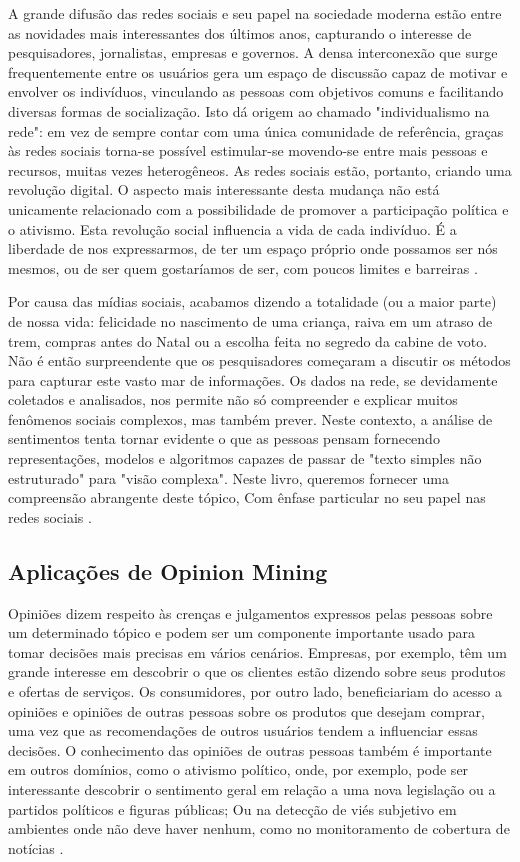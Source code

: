 \documentclass[
	12pt,				%
	openright,			%
	oneside,			%
	a4paper,			%
	english,			%
	spanish,			%
	brazil				%
	]{abntex2}
\begin{document}
A grande difusão das redes sociais e seu papel na sociedade moderna estão entre as novidades mais interessantes dos últimos anos, capturando o interesse de pesquisadores, jornalistas, empresas e governos. A densa interconexão que surge frequentemente entre os usuários gera um espaço de discussão capaz de motivar e envolver os indivíduos, vinculando as pessoas com objetivos comuns e facilitando diversas formas de socialização. Isto dá origem ao chamado "individualismo na rede": em vez de sempre contar com uma única comunidade de referência, graças às redes sociais torna-se possível estimular-se movendo-se entre mais pessoas e recursos, muitas vezes heterogêneos. As redes sociais estão, portanto, criando uma revolução digital. O aspecto mais interessante desta mudança não está unicamente relacionado com a possibilidade de promover a participação política e o ativismo. Esta revolução social influencia a vida de cada indivíduo. É a liberdade de nos expressarmos, de ter um espaço próprio onde possamos ser nós mesmos, ou de ser quem gostaríamos de ser, com poucos limites e barreiras \cite{book_sentiment_social}.

Por causa das mídias sociais, acabamos dizendo a totalidade (ou a maior parte) de nossa vida: felicidade no nascimento de uma criança, raiva em um atraso de trem, compras antes do Natal ou a escolha feita no segredo da cabine de voto. Não é então surpreendente que os pesquisadores começaram a discutir os métodos para capturar este vasto mar de informações. Os dados na rede, se devidamente coletados e analisados, nos permite não só compreender e explicar muitos fenômenos sociais complexos, mas também prever. Neste contexto, a análise de sentimentos tenta tornar evidente o que as pessoas pensam fornecendo representações, modelos e algoritmos capazes de passar de "texto simples não estruturado" para "visão complexa". Neste livro, queremos fornecer uma compreensão abrangente deste tópico, Com ênfase particular no seu papel nas redes sociais \cite{book_sentiment_social}.

	\subsection*{Aplicações de Opinion Mining}
	
	Opiniões dizem respeito às crenças e julgamentos expressos pelas pessoas sobre um determinado tópico e podem ser um componente importante usado para tomar decisões mais precisas em vários cenários\cite{book_discover_practices}. Empresas, por exemplo, têm um grande interesse em descobrir o que os clientes estão dizendo sobre seus produtos e ofertas de serviços. Os consumidores, por outro lado, beneficiariam do acesso a opiniões e opiniões de outras pessoas sobre os produtos que desejam comprar, uma vez que as recomendações de outros usuários tendem a influenciar essas decisões. O conhecimento das opiniões de outras pessoas também é importante em outros domínios, como o ativismo político, onde, por exemplo, pode ser interessante descobrir o sentimento geral em relação a uma nova legislação ou a partidos políticos e figuras públicas\cite{book_political_opinion}; Ou na detecção de viés subjetivo em ambientes onde não deve haver nenhum, como no monitoramento de cobertura de notícias \cite{book_discover_practices}.
\end{document}
